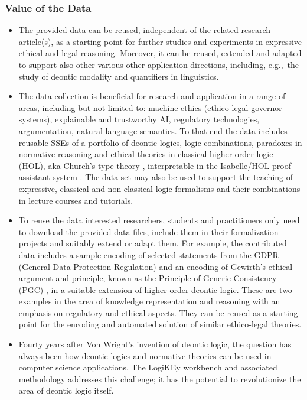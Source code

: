 \documentclass{article}
\begin{document}
\subsubsection*{Value of the Data}
\begin{itemize}
\item The provided data can be reused, independent of the related
  research article(s), as a starting point for further studies and
  experiments in expressive ethical and legal
  reasoning. Moreover, it can be reused, extended and adapted to
  support also other various other application directions, including, e.g.,~the study of deontic modality and quantifiers in linguistics.

\item The data collection is beneficial for research and application
  in a range of areas, including but not limited to: machine ethics
  (ethico-legal governor systems), explainable and trustworthy AI,
  regulatory technologies, argumentation, natural language semantics. To that end the data includes reusable SSEs
  of a portfolio of deontic logics, logic combinations, paradoxes in
  normative reasoning and ethical theories in classical higher-order
  logic (HOL), aka Church's type theory \cite{J43}, interpretable in
  the Isabelle/HOL proof assistant system \cite{Isabelle}. The data
  set may also be used to support the teaching of expressive,
  classical and non-classical logic
  formalisms and their combinations in lecture courses and tutorials.

\item To reuse the data interested researchers, 
  students and practitioners only 
  need to download the provided data files, include them in their
  formalization projects and suitably extend or adapt them. For
  example, the contributed data includes a sample encoding of selected
  statements from the GDPR (General Data Protection Regulation) and an
  encoding of Gewirth's ethical argument and principle, known as the
  Principle of Generic Consistency (PGC) \cite{GewirthRM}, in a suitable extension of
  higher-order deontic logic. These are two examples in the area of
  knowledge representation and reasoning with an emphasis on
  regulatory and ethical aspects. They can be reused as a starting
  point for the encoding and automated solution of similar
  ethico-legal theories.

\item Fourty years after Von Wright's invention of deontic logic, the
  question has always been how deontic logics and normative theories
  can be used in computer science applications. The LogiKEy 
  workbench and associated methodology addresses this challenge; it has the potential to revolutionize the
  area of deontic logic itself.



\end{itemize}
\end{document}

